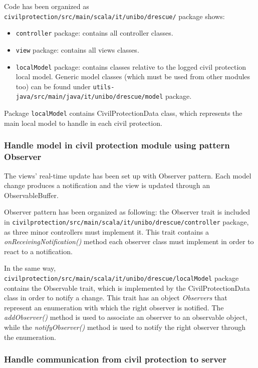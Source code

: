 \documentclass[a4paper,12pt]{report}
\begin{document}
Code has been organized as \texttt{civilprotection/src/main/scala/it/unibo/drescue/} package shows: 

\begin{itemize}
\item \texttt{controller} package: contains all controller classes.
\item \texttt{view} package: contains all views classes.
\item \texttt{localModel} package: contains classes relative to the logged civil protection local model. Generic model classes (which must be used from other modules too) can be found under \texttt{utils-java/src/main/java/it/unibo/drescue/model} package.
\end{itemize} 

Package \texttt{localModel} contains CivilProtectionData class, which represents the main local model to handle in each civil protection.


\subsubsection{Handle model in civil protection module using pattern Observer}

The views' real-time update has been set up with Observer pattern. Each model change produces a notification and the view is updated through an ObservableBuffer.

Observer pattern has been organized as following: the Observer trait is included in \texttt{civilprotection/src/main/scala/it/unibo/drescue/controller} package, as three minor controllers must implement it. This trait contains a \textit{onReceivingNotification()} method each observer class must implement in order to react to a notification.

In the same way, \texttt{civilprotection/src/main/scala/it/unibo/drescue/localModel} package contains the Observable trait, which is implemented by the CivilProtectionData class in order to notify a change. This trait has an object \textit{Observers} that represent an enumeration with which the right observer is notified. The \textit{addObserver()} method is used to associate an observer to an observable object, while the \textit{notifyObserver()} method is used to notify the right observer through the enumeration.

\subsubsection{Handle communication from civil protection to server}
\end{document}

